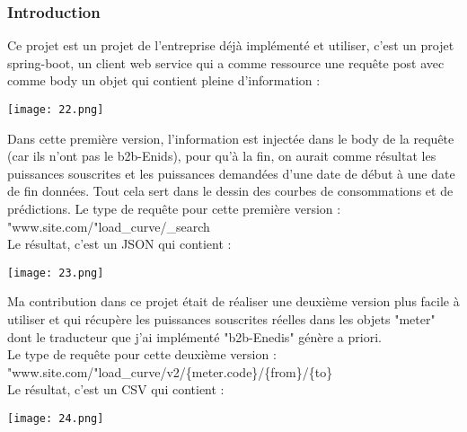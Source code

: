 \subsubsection{Introduction}
Ce projet est un projet de l'entreprise déjà implémenté et utiliser, c'est un projet spring-boot, un client web service qui a comme ressource une requête post avec comme body  un objet qui contient pleine d'information :
\begin{center}
	\texttt{[image: 22.png]}
\end{center}
Dans cette première version, l'information est injectée dans le body de la requête (car ils n'ont pas le b2b-Enids), pour qu'à la fin, on aurait comme résultat les puissances souscrites et les puissances demandées d'une date de début à une date de fin données. Tout cela sert dans le dessin des courbes de consommations et de prédictions. Le type de requête pour cette première version :\\
"www.site.com/"load{\_}curve/{\_}search\\
Le résultat, c'est un JSON qui contient :
\begin{center}
	\texttt{[image: 23.png]}
\end{center}
Ma contribution dans ce projet était de réaliser une deuxième  version plus facile à utiliser et qui récupère les puissances souscrites réelles dans les objets "meter" dont le traducteur que j'ai implémenté "b2b-Enedis" génère a priori.\\
Le type de requête pour cette deuxième version :\\
"www.site.com/"load{\_}curve/v2/\{meter.code\}/\{from\}/\{to\}\\
Le résultat, c'est un CSV qui contient :
\begin{center}
	\texttt{[image: 24.png]}
\end{center}
